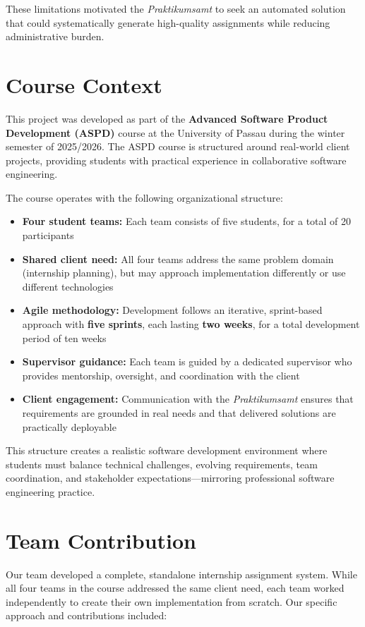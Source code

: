 \documentclass[12pt,a4paper]{report}
\begin{document}
These limitations motivated the \textit{Praktikumsamt} to seek an automated solution that could systematically generate high-quality assignments while reducing administrative burden.

\section{Course Context}

This project was developed as part of the \textbf{Advanced Software Product Development (ASPD)} course at the University of Passau during the winter semester of 2025/2026. The ASPD course is structured around real-world client projects, providing students with practical experience in collaborative software engineering.

The course operates with the following organizational structure:
\begin{itemize}
    \item \textbf{Four student teams:} Each team consists of five students, for a total of 20 participants
    \item \textbf{Shared client need:} All four teams address the same problem domain (internship planning), but may approach implementation differently or use different technologies
    \item \textbf{Agile methodology:} Development follows an iterative, sprint-based approach with \textbf{five sprints}, each lasting \textbf{two weeks}, for a total development period of ten weeks
    \item \textbf{Supervisor guidance:} Each team is guided by a dedicated supervisor who provides mentorship, oversight, and coordination with the client
    \item \textbf{Client engagement:} Communication with the \textit{Praktikumsamt} ensures that requirements are grounded in real needs and that delivered solutions are practically deployable
\end{itemize}

This structure creates a realistic software development environment where students must balance technical challenges, evolving requirements, team coordination, and stakeholder expectations—mirroring professional software engineering practice.

\section{Team Contribution}

Our team developed a complete, standalone internship assignment system. While all four teams in the course addressed the same client need, each team worked independently to create their own implementation from scratch. Our specific approach and contributions included:
\end{document}
